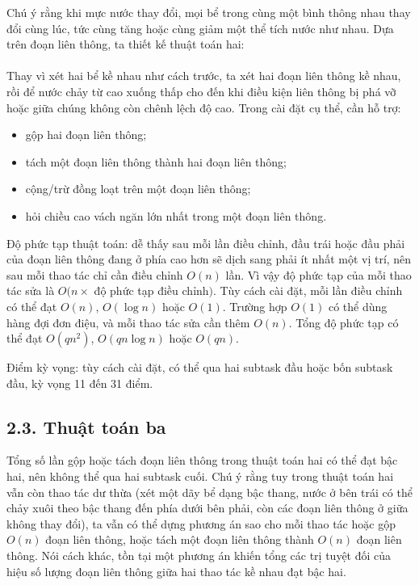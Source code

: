 \documentclass[11pt]{article}
\begin{document}
Chú ý rằng khi mực nước thay đổi, mọi bể trong cùng một bình thông nhau thay
đổi cùng lúc, tức cùng tăng hoặc cùng giảm một thể tích nước như nhau. Dựa
trên đoạn liên thông, ta thiết kế thuật toán hai:

\paragraph{}
Thay vì xét hai bể kề nhau như cách trước, ta xét hai đoạn liên thông kề
nhau, rồi để nước chảy từ cao xuống thấp cho đến khi điều kiện liên thông bị
phá vỡ hoặc giữa chúng không còn chênh lệch độ cao. Trong cài đặt cụ thể, cần
hỗ trợ:

\begin{itemize}
  \item gộp hai đoạn liên thông;
  \item tách một đoạn liên thông thành hai đoạn liên thông;
  \item cộng/trừ đồng loạt trên một đoạn liên thông;
  \item hỏi chiều cao vách ngăn lớn nhất trong một đoạn liên thông.
\end{itemize}

Độ phức tạp thuật toán: dễ thấy sau mỗi lần điều chỉnh, đầu trái hoặc đầu
phải của đoạn liên thông đang ở phía cao hơn sẽ dịch sang phải ít nhất một
vị trí, nên sau mỗi thao tác chỉ cần điều chỉnh \(O(n)\) lần. Vì vậy độ phức
tạp của mỗi thao tác sửa là \(O(n\times\) độ phức tạp điều chỉnh\()\). Tùy
cách cài đặt, mỗi lần điều chỉnh có thể đạt \(O(n)\), \(O(\log n)\) hoặc
\(O(1)\). Trường hợp \(O(1)\) có thể dùng hàng đợi đơn điệu, và mỗi thao tác
sửa cần thêm \(O(n)\). Tổng độ phức tạp có thể đạt \(O(qn^2)\), \(O(qn\log n)\)
hoặc \(O(qn)\).

Điểm kỳ vọng: tùy cách cài đặt, có thể qua hai subtask đầu hoặc bốn subtask
đầu, kỳ vọng 11 đến 31 điểm.

\subsection*{2.3. Thuật toán ba}

Tổng số lần gộp hoặc tách đoạn liên thông trong thuật toán hai có thể đạt bậc
hai, nên không thể qua hai subtask cuối. Chú ý rằng tuy trong thuật toán hai
vẫn còn thao tác dư thừa (xét một dãy bể dạng bậc thang, nước ở bên trái có
thể chảy xuôi theo bậc thang đến phía dưới bên phải, còn các đoạn liên thông
ở giữa không thay đổi), ta vẫn có thể dựng phương án sao cho mỗi thao tác
hoặc gộp \(O(n)\) đoạn liên thông, hoặc tách một đoạn liên thông thành \(O(n)\)
đoạn liên thông. Nói cách khác, tồn tại một phương án khiến tổng các trị tuyệt
đối của hiệu số lượng đoạn liên thông giữa hai thao tác kề nhau đạt bậc hai.
\end{document}
